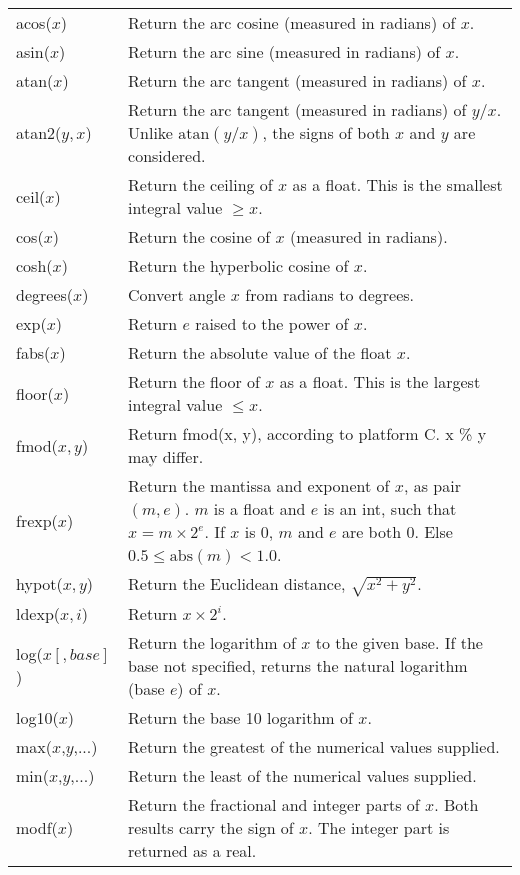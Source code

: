 \documentclass[a4paper,onecolumn,11pt]{book}
\begin{document}
\begin{table}
\begin{longtable}{|lp{8cm}|}
\hline
acos($x$)&
Return the arc cosine (measured in radians) of $x$.\\
asin($x$)&
Return the arc sine (measured in radians) of $x$.\\
atan($x$)&
Return the arc tangent (measured in radians) of $x$.\\
atan2($y,x$)&
Return the arc tangent (measured in radians) of $y/x$. Unlike $\mathrm{atan}(y/x)$, the signs of both $x$ and $y$ are considered.\\
ceil($x$)&
Return the ceiling of $x$ as a float. This is the smallest integral value $\geq x$.\\
cos($x$)&
Return the cosine of $x$ (measured in radians).\\
cosh($x$)&
Return the hyperbolic cosine of $x$.\\
degrees($x$)&
Convert angle $x$ from radians to degrees.\\
exp($x$)&
Return $e$ raised to the power of $x$.\\
fabs($x$)&
Return the absolute value of the float $x$.\\
floor($x$)&
Return the floor of $x$ as a float. This is the largest integral value $\leq x$.\\
fmod($x,y$)&
Return fmod(x, y), according to platform C.  x \% y may differ.\\
frexp($x$)&
Return the mantissa and exponent of $x$, as pair $(m,e)$. $m$ is a float and $e$ is an int, such that $x = m \times 2^e$. If $x$ is 0, $m$ and $e$ are both 0.  Else $0.5 \leq \mathrm{abs}(m) < 1.0$.\\
hypot($x,y$)&
Return the Euclidean distance, $\sqrt{x^2 + y^2}$.\\
ldexp($x, i$)&
Return $x \times 2^i$. \\
log($x[,base]$)&
Return the logarithm of $x$ to the given base. If the base not specified, returns the natural logarithm (base $e$) of $x$.\\
log10($x$)&
Return the base 10 logarithm of $x$.\\
max($x$,$y$,...)&
Return the greatest of the numerical values supplied.\\
min($x$,$y$,...)&
Return the least of the numerical values supplied.\\
modf($x$)&
Return the fractional and integer parts of $x$.  Both results carry the sign of $x$.  The integer part is returned as a real.\\

\end{longtable}
\end{table}
\end{document}
